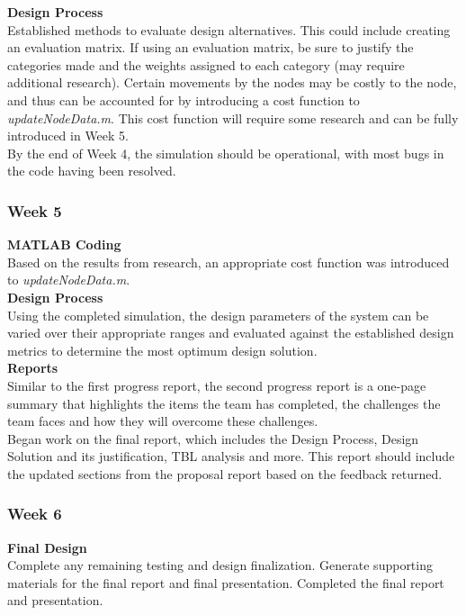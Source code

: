 \documentclass[../CourseManual.tex]{subfiles}
\begin{document}
\textbf{Design Process}\\
Established methods to evaluate design alternatives. This could include creating an evaluation matrix. If using an evaluation matrix, be sure to justify the categories made and the weights assigned to each category (may require additional research). Certain movements by the nodes may be costly to the node, and thus can be accounted for by introducing a cost function to \textit{updateNodeData.m}. This cost function will require some research and can be fully introduced in Week 5. \\

By the end of Week 4, the simulation should be operational, with most bugs in the code having been resolved.  

\subsubsection{Week 5} \label{Week 5: Opinion}
\textbf{MATLAB Coding}\\
Based on the results from research, an appropriate cost function was introduced to \textit{updateNodeData.m}.\\

\textbf{Design Process}\\
Using the completed simulation, the design parameters of the system can be varied over their appropriate ranges and evaluated against the established design metrics to determine the most optimum design solution. \\

\textbf{Reports}\\
Similar to the first progress report, the second progress report is a one-page summary that highlights the items the team has completed, the challenges the team faces and how they will overcome these challenges.\\

Began work on the final report, which includes the Design Process, Design Solution and its justification, TBL analysis and more. This report should include the updated sections from the proposal report based on the feedback returned.

\subsubsection{Week 6} \label{Week 6: Opinion}
\textbf{Final Design}\\
Complete any remaining testing and design finalization. Generate supporting materials for the final report and final presentation. Completed the final report and presentation.
\end{document}

